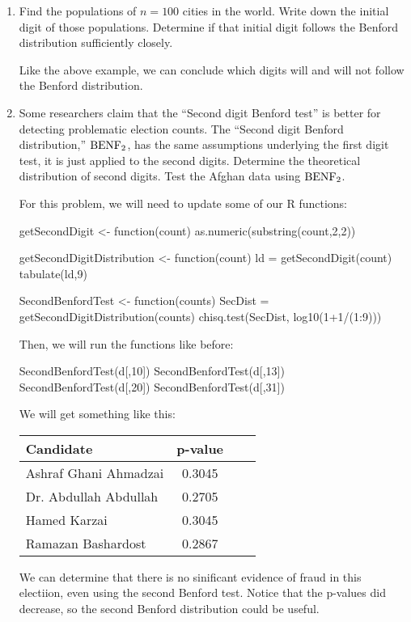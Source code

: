 \begin{enumerate}
 \item Find the populations of $n=100$ cities in the world. Write down the initial digit of those populations. Determine if that initial digit follows the Benford distribution sufficiently closely.
\begin{solution}
Like the above example, we can conclude which digits will and will not follow the Benford distribution. 
\end{solution}

 \item Some researchers claim that the ``Second digit Benford test'' is better for detecting problematic election counts. The ``Second digit Benford distribution,'' $\text{BENF}_2$, has the same assumptions underlying the first digit test, it is just applied to the second digits. Determine the theoretical distribution of second digits. Test the Afghan data using $\text{BENF}_2$.
\begin{solution}
For this problem, we will need to update some of our R functions:
\begin{codein}
getSecondDigit <- function(count) {
  as.numeric(substring(count,2,2))
}

getSecondDigitDistribution <- function(count) {
  ld = getSecondDigit(count)
  tabulate(ld,9)
}

SecondBenfordTest <- function(counts) {
  SecDist = getSecondDigitDistribution(counts)
chisq.test(SecDist, log10(1+1/(1:9)))
}
\end{codein}

Then, we will run the functions like before:
\begin{codein}
SecondBenfordTest(d[,10])
SecondBenfordTest(d[,13])
SecondBenfordTest(d[,20])
SecondBenfordTest(d[,31])
\end{codein}

We will get something like this:
\begin{center}
\begin{tabular}{lccc}
Candidate & p-value \\
\midrule
Ashraf Ghani Ahmadzai         & 0.3045\\
Dr. Abdullah Abdullah          & 0.2705 \\
Hamed Karzai         & 0.3045\\
Ramazan Bashardost         &0.2867 \\
\end{tabular}
\end{center}

We can determine that there is no sinificant evidence of fraud in this electiion, even using the second Benford test. Notice that the p-values did decrease, so the second Benford distribution could be useful. 
\end{solution}

\end{enumerate}




